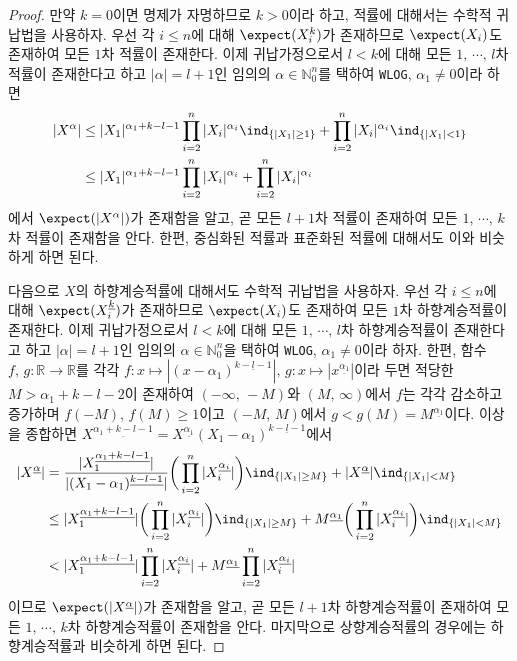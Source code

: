 \begin{proof}
    만약 $k=0$이면 명제가 자명하므로 $k>0$이라 하고, 적률에 대해서는 수학적 귀납법을 사용하자. 우선 각 $i\leq n$에 대해 $\expect(X_i^k)$가 존재하므로 $\expect(X_i)$도 존재하여 모든 $1$차 적률이 존재한다. 이제 귀납가정으로서 $l<k$에 대해 모든 $1,\,\cdots,\,l$차 적률이 존재한다고 하고 $|\alpha|=l+1$인 임의의 $\alpha\in\mathbb{N}_0^n$를 택하여 \texttt{WLOG}, $\alpha_1\ne0$이라 하면
    \begin{align*}
        |X^\alpha|&\leq|X_1|^{\alpha_1+k-l-1}\prod_{i=2}^n|X_i|^{\alpha_i}\ind_{\{|X_1|\geq1\}}+\prod_{i=2}^n|X_i|^{\alpha_i}\ind_{\{|X_1|<1\}}\\
        &\leq|X_1|^{\alpha_1+k-l-1}\prod_{i=2}^n|X_i|^{\alpha_i}+\prod_{i=2}^n|X_i|^{\alpha_i}
    \end{align*}
    에서 $\expect(|X^\alpha|)$가 존재함을 알고, 곧 모든 $l+1$차 적률이 존재하여 모든 $1,\,\cdots,\,k$차 적률이 존재함을 안다. 한편, 중심화된 적률과 표준화된 적률에 대해서도 이와 비슷하게 하면 된다.

    다음으로 $X$의 하향계승적률에 대해서도 수학적 귀납법을 사용하자. 우선 각 $i\leq n$에 대해 $\expect(X_i^{\underline{k}})$가 존재하므로 $\expect(X_i)$도 존재하여 모든 $1$차 하향계승적률이 존재한다. 이제 귀납가정으로서 $l<k$에 대해 모든 $1,\,\cdots,\,l$차 하향계승적률이 존재한다고 하고 $|\alpha|=l+1$인 임의의 $\alpha\in\mathbb{N}_0^n$을 택하여 \texttt{WLOG}, $\alpha_1\ne0$이라 하자. 한편, 함수 $f,\,g:\mathbb{R}\to\mathbb{R}$를 각각 $f:x\mapsto|(x-\alpha_1)^{\underline{k-l-1}}|,\,g:x\mapsto|x^{\underline{\alpha_1}}|$이라 두면 적당한 $M>\alpha_1+k-l-2$이 존재하여 $(-\infty,\,-M)$와 $(M,\,\infty)$에서 $f$는 각각 감소하고 증가하며 $f(-M),\,f(M)\geq1$이고 $(-M,\,M)$에서 $g<g(M)=M^{\underline{\alpha_1}}$이다. 이상을 종합하면 $X^{\underline{\alpha_1+k-l-1}}=X^{\underline{\alpha_1}}(X_1-\alpha_1)^{\underline{k-l-1}}$에서
    \begin{align*}
        |X^{\underline{\alpha}}|&=\frac{|X_1^{\underline{\alpha_1+k-l-1}}|}{|(X_1-\alpha_1)^{\underline{k-l-1}}|}\bigg(\prod_{i=2}^n|X_i^{\underline{\alpha_i}}|\bigg)\ind_{\{|X_1|\geq M\}}+|X^{\underline{\alpha}}|\ind_{\{|X_1|<M\}}\\
        &\leq|X_1^{\underline{\alpha_1+k-l-1}}|\bigg(\prod_{i=2}^n|X_i^{\underline{\alpha_i}}|\bigg)\ind_{\{|X_1|\geq M\}}+M^{\underline{\alpha_1}}\bigg(\prod_{i=2}^n|X_i^{\underline{\alpha_i}}|\bigg)\ind_{\{|X_1|<M\}}\\
        &<|X_1^{\underline{\alpha_1+k-l-1}}|\prod_{i=2}^n|X_i^{\underline{\alpha_i}}|+M^{\underline{\alpha_1}}\prod_{i=2}^n|X_i^{\underline{\alpha_i}}|
    \end{align*}
    이므로 $\expect(|X^{\underline{\alpha}}|)$가 존재함을 알고, 곧 모든 $l+1$차 하향계승적률이 존재하여 모든 $1,\,\cdots,\,k$차 하향계승적률이 존재함을 안다. 마지막으로 상향계승적률의 경우에는 하향계승적률과 비슷하게 하면 된다.
\end{proof}

